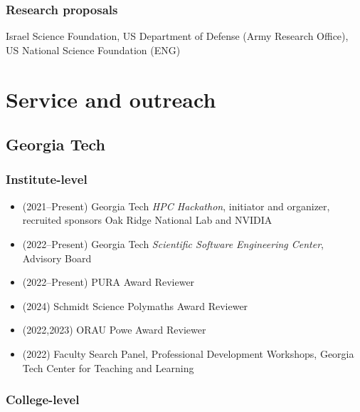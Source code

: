 \subsubsection{Research proposals}

Israel Science Foundation, US Department of Defense (Army Research Office), US National Science Foundation (ENG)

\section{Service and outreach}

\subsection{Georgia Tech}

\subsubsection{Institute-level}

\begin{itemize}
    \item (2021--Present) Georgia Tech \textit{HPC Hackathon}, initiator and organizer, recruited sponsors Oak Ridge National Lab and NVIDIA 
    \item (2022--Present) Georgia Tech \textit{Scientific Software Engineering Center}, Advisory Board
    \item (2022--Present) PURA Award Reviewer
    \item (2024) Schmidt Science Polymaths Award Reviewer
    \item (2022,2023) ORAU Powe Award Reviewer
    \item (2022) Faculty Search Panel, Professional Development Workshops, Georgia Tech Center for Teaching and Learning
\end{itemize}

\subsubsection{College-level}

